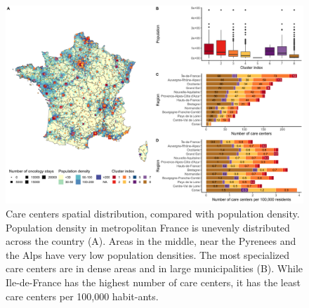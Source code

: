 \begin{figure}[t]
    \includegraphics[width=\textwidth]{images/camion/supplemental/sup_fig4_care_centers_pop_density.png}
    \centering
    \caption{
        Care centers spatial distribution, compared with population density. Population density in metropolitan France is unevenly distributed across the country (A). Areas in the middle, near the Pyrenees and the Alps have very low population densities. The most specialized care centers are in dense areas and in large municipalities (B). While Ile-de-France has the highest number of care centers, it has the least care centers per 100,000 habit-ants.
    }
    \label{fig:clustering-map}
\end{figure}

